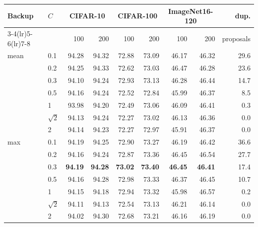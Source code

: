 \begin{tabular}{@{}llrrrrrrr@{}}
\toprule
\multirow{2}{*}{Backup} & \multirow{2}{*}{$C$} & \multicolumn{2}{c}{CIFAR-10} & \multicolumn{2}{c}{CIFAR-100} & \multicolumn{2}{c}{ImageNet16-120} & dup.\\
\cmidrule(lr){3-4}\cmidrule(lr){5-6}\cmidrule(lr){7-8}
 & & 100 & 200 & 100 & 200 & 100 & 200 & proposals\\
\midrule
mean & 0.1 & 94.28 & 94.32 & 72.88 & 73.09 & 46.17 & 46.32 & 29.6\\
 & 0.2 & 94.25 & 94.33 & 72.62 & 73.03 & 46.47 & 46.28 & 23.6\\
 & 0.3 & 94.10 & 94.24 & 72.93 & 73.13 & 46.28 & 46.44 & 14.7\\
 & 0.5 & 94.16 & 94.24 & 72.52 & 72.84 & 45.99 & 46.37 & 8.5\\
 & 1 & 93.98 & 94.20 & 72.49 & 73.06 & 46.09 & 46.41 & 0.3\\
 & $\sqrt{2}$ & 94.13 & 94.24 & 72.27 & 73.02 & 46.13 & 46.36 & 0.0\\
 & 2 & 94.14 & 94.23 & 72.27 & 72.97 & 45.91 & 46.37 & 0.0\\
\midrule
max & 0.1 & 94.19 & 94.25 & 72.90 & 73.27 & 46.19 & 46.42 & 36.6\\
 & 0.2 & 94.16 & 94.24 & 72.87 & 73.36 & 46.45 & 46.54 & 27.7\\
 & 0.3 & \textbf{94.19} & \textbf{94.28} & \textbf{73.02} & \textbf{73.40} & \textbf{46.45} & \textbf{46.41} & 17.4\\
 & 0.5 & 94.16 & 94.28 & 72.98 & 73.33 & 46.37 & 46.45 & 10.7\\
 & 1 & 94.15 & 94.18 & 72.94 & 73.32 & 45.98 & 46.57 & 0.2\\
 & $\sqrt{2}$ & 94.11 & 94.13 & 72.54 & 73.13 & 46.21 & 46.14 & 0.0\\
 & 2 & 94.02 & 94.30 & 72.68 & 73.21 & 46.16 & 46.19 & 0.0\\
\bottomrule
\end{tabular}
